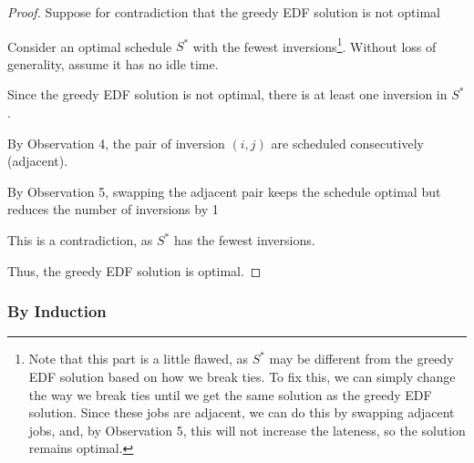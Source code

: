 \begin{proof}
    Suppose for contradiction that the greedy EDF solution is not optimal

    \begin{listu}
        \item Consider an optimal schedule $S^*$ with the fewest inversions\footnote{Note that this part is a little flawed, as $S^*$ may be different from the greedy EDF solution based on how we break ties. To fix this, we can simply change the way we break ties until we get the same solution as the greedy EDF solution. Since these jobs are adjacent, we can do this by swapping adjacent jobs, and, by Observation 5, this will not increase the lateness, so the solution remains optimal.}. Without loss of generality, assume it has no idle time.

        \item Since the greedy EDF solution is not optimal, there is at least one inversion in $S^*$.

        \item By Observation 4, the pair of inversion $(i, j)$ are scheduled consecutively (adjacent).

        \item By Observation 5, swapping the adjacent pair keeps the schedule optimal but reduces the number of inversions by 1

        This is a contradiction, as $S^*$ has the fewest inversions.
    \end{listu}

    Thus, the greedy EDF solution is optimal.
\end{proof}

\subsubsection{By Induction}

